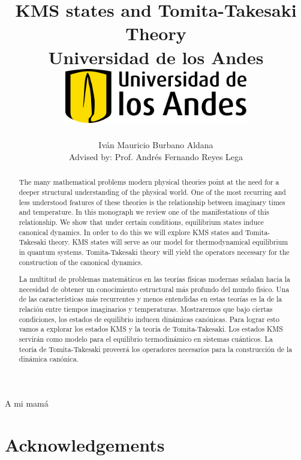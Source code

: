 \documentclass[12pt]{report}
\title 
{
	{KMS states and Tomita-Takesaki Theory}\\
	{\large Universidad de los Andes}\\
	\vspace{1.5cm}
	{\includegraphics[width = 0.6\textwidth]{logo.png}}	
}
\author{Iván Mauricio Burbano Aldana\\[1cm]{\small Advised by: Prof. Andrés Fernando Reyes Lega}}
\newenvironment{dedication}
  {\clearpage           %
   \thispagestyle{empty}%
   \vspace*{\stretch{1}}%
   \raggedleft          %
  }
  {\par %
   \vspace{\stretch{3}} %
   \clearpage           %
  }
\theoremstyle{definition}
\begin{document}

\maketitle

\begin{dedication}
{\LARGE\calligra A mi mamá}
\end{dedication}

\begin{abstract}

The many mathematical problems modern physical theories point at the need for a deeper structural understanding of the physical world. One of the most recurring and less understood features of these theories is the relationship between imaginary times and temperature. In this monograph we review one of the manifestations of this relationship. We show that under certain conditions, equilibrium states induce canonical dynamics. In order to do this we will explore KMS states and Tomita-Takesaki theory. KMS states will serve as our model for thermodynamical equilibrium in quantum systems. Tomita-Takesaki theory will yield the operators necessary for the construction of the canonical dynamics.

\end{abstract}

\begin{otherlanguage}{spanish}
\begin{abstract}

La multitud de problemas matemáticos en las teorías físicas modernas señalan hacia la necesidad de obtener un conocimiento estructural más profundo del mundo físico. Una de las características más recurrentes y menos entendidas en estas teorías es la de la relación entre tiempos imaginarios y temperaturas. Mostraremos que bajo ciertas condiciones, los estados de equilibrio inducen dinámicas canónicas. Para lograr esto vamos a explorar los estados KMS y la teoría de Tomita-Takesaki. Los estados KMS servirán como modelo para el equilibrio termodinámico en sistemas cuánticos. La teoría de Tomita-Takesaki proveerá los operadores necesarios para la construcción de la dinámica canónica.

\end{abstract}
\end{otherlanguage}

\newpage

\chapter*{Acknowledgements}
\end{document}
